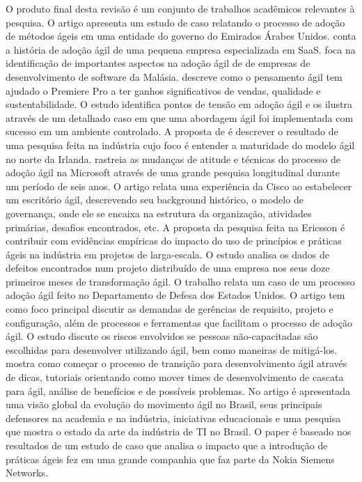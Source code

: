 O produto final desta revisão é um conjunto de trabalhos acadêmicos relevantes à pesquisa. O artigo \cite{Hajjdiab2011} apresenta um estudo de caso relatando o processo de adoção de métodos ágeis em uma entidade do governo do Emirados Árabes Unidos. \cite{Block2011} conta a história de adoção ágil de uma pequena empresa especializada em SaaS. \cite{Asnawi2012} foca na identificação de importantes aspectos na adoção ágil de de empresas de desenvolvimento de software da Malásia. \cite{Adobe2012} descreve como o pensamento ágil tem ajudado o Premiere Pro a ter ganhos significativos de vendas, qualidade e sustentabilidade. O estudo \cite{Fitzgerald2013} identifica pontos de tensão em adoção ágil e os ilustra através de um detalhado caso em que uma abordagem ágil foi implementada com sucesso em um ambiente controlado. A proposta de \cite{Bustard2013} é descrever o resultado de uma pesquisa feita na indústria cujo foco é entender a maturidade do modelo ágil no norte da Irlanda. \cite{Microsoft2013} rastreia as mudanças de atitude e técnicas do processo de adoção ágil na Microsoft através de uma grande pesquisa longitudinal durante um período de seis anos. O artigo \cite{Cisco2011} relata uma experiência da Cisco ao estabelecer um escritório ágil, descrevendo seu background histórico, o modelo de governança, onde ele se encaixa na estrutura da organização, atividades primárias, desafios encontrados, etc. A proposta da pesquisa \cite{Ericsson2013} feita na Ericsson é contribuir com evidências empíricas do impacto do uso de princípios e práticas ágeis na indústria em projetos de larga-escala. O estudo \cite{Korhonen2010} analisa os dados de defeitos encontrados num projeto distribuído de uma empresa nos seus doze primeiros meses de transformação ágil. O trabalho \cite{Lapham2012} relata um caso de um processo adoção ágil feito no Departamento de Defesa dos Estados Unidos. O artigo \cite{Arikpo2011} tem como foco principal discutir as demandas de gerências de requisito, projeto e configuração, além de processos e ferramentas que facilitam o processo de adoção ágil. O estudo \cite{Radha2012} discute os riscos envolvidos se pessoas não-capacitadas são escolhidas para desenvolver utilizando ágil, bem como maneiras de mitigá-los. \cite{Eunha2012} mostra como começar o processo de transição para desenvolvimento ágil através de dicas, tutoriais orientando como mover times de desenvolvimento de cascata para ágil, análise de benefícios e de possíveis problemas. No artigo \cite{Claudia2013} é apresentada uma visão global da evolução do movimento ágil no Brasil, seus principais defensores na academia e na indústria, iniciativas educacionais e uma pesquisa que mostra o estado da arte da indústria de TI no Brasil. O paper \cite{Nokia2013} é baseado nos resultados de um estudo de caso que analisa o impacto que a introdução de práticas ágeis fez em uma grande companhia que faz parte da Nokia Siemens Networks.

